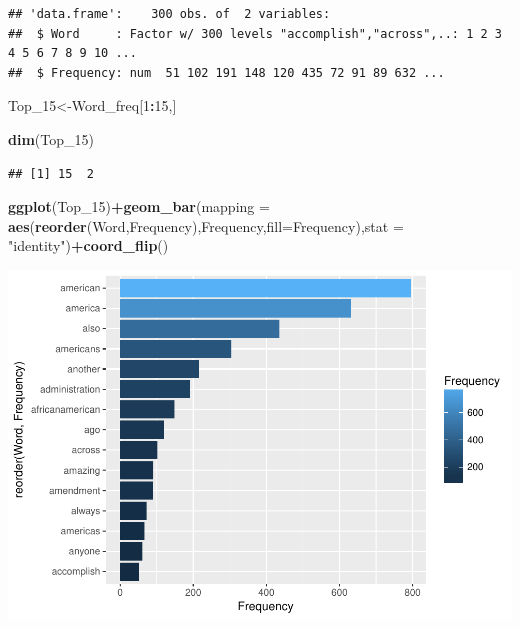 \documentclass[]{article}
\newenvironment{Shaded}{\begin{snugshade}}{\end{snugshade}}
\newcommand{\KeywordTok}[1]{\textcolor[rgb]{0.13,0.29,0.53}{\textbf{#1}}}
\newcommand{\DataTypeTok}[1]{\textcolor[rgb]{0.13,0.29,0.53}{#1}}
\newcommand{\DecValTok}[1]{\textcolor[rgb]{0.00,0.00,0.81}{#1}}
\newcommand{\StringTok}[1]{\textcolor[rgb]{0.31,0.60,0.02}{#1}}
\newcommand{\OperatorTok}[1]{\textcolor[rgb]{0.81,0.36,0.00}{\textbf{#1}}}
\newcommand{\NormalTok}[1]{#1}
\begin{document}
\begin{verbatim}
## 'data.frame':    300 obs. of  2 variables:
##  $ Word     : Factor w/ 300 levels "accomplish","across",..: 1 2 3 4 5 6 7 8 9 10 ...
##  $ Frequency: num  51 102 191 148 120 435 72 91 89 632 ...
\end{verbatim}

\begin{Shaded}
\begin{Highlighting}[]
\NormalTok{Top_}\DecValTok{15}\NormalTok{<-Word_freq[}\DecValTok{1}\OperatorTok{:}\DecValTok{15}\NormalTok{,]}

\KeywordTok{dim}\NormalTok{(Top_}\DecValTok{15}\NormalTok{)}
\end{Highlighting}
\end{Shaded}

\begin{verbatim}
## [1] 15  2
\end{verbatim}

\begin{Shaded}
\begin{Highlighting}[]
\KeywordTok{ggplot}\NormalTok{(Top_}\DecValTok{15}\NormalTok{)}\OperatorTok{+}\KeywordTok{geom_bar}\NormalTok{(}\DataTypeTok{mapping =} \KeywordTok{aes}\NormalTok{(}\KeywordTok{reorder}\NormalTok{(Word,Frequency),Frequency,}\DataTypeTok{fill=}\NormalTok{Frequency),}\DataTypeTok{stat =} \StringTok{"identity"}\NormalTok{)}\OperatorTok{+}\KeywordTok{coord_flip}\NormalTok{()}
\end{Highlighting}
\end{Shaded}

\includegraphics{Donald_Trump_Speech_sentiment_analysis_files/figure-latex/unnamed-chunk-16-1.pdf}
\end{document}
